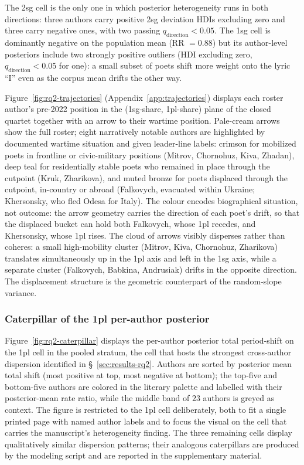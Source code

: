 \documentclass[12pt]{interact}
\theoremstyle{plain}%
\theoremstyle{definition}
\theoremstyle{remark}
\begin{document}
The 2sg cell is the only one in which posterior heterogeneity runs in both directions: three authors carry positive 2sg deviation HDIs excluding zero and three carry negative ones, with two passing $q_{\text{direction}} < 0.05$. The 1sg cell is dominantly negative on the population mean (RR $= 0.88$) but its author-level posteriors include two strongly positive outliers (HDI excluding zero, $q_{\text{direction}} < 0.05$ for one): a small subset of poets shift more weight onto the lyric ``I'' even as the corpus mean drifts the other way.

Figure~\ref{fig:rq2-trajectories} (Appendix~\ref{app:trajectories}) displays each roster author's pre-2022 position in the (1sg-share, 1pl-share) plane of the closed quartet together with an arrow to their wartime position. Pale-cream arrows show the full roster; eight narratively notable authors are highlighted by documented wartime situation and given leader-line labels: crimson for mobilized poets in frontline or civic-military positions (Mitrov, Chornohuz, Kiva, Zhadan), deep teal for residentially stable poets who remained in place through the cutpoint (Kruk, Zharikova), and muted bronze for poets displaced through the cutpoint, in-country or abroad (Falkovych, evacuated within Ukraine; Khersonsky, who fled Odesa for Italy). The colour encodes biographical situation, not outcome: the arrow geometry carries the direction of each poet's drift, so that the displaced bucket can hold both Falkovych, whose 1pl recedes, and Khersonsky, whose 1pl rises. The cloud of arrows visibly disperses rather than coheres: a small high-mobility cluster (Mitrov, Kiva, Chornohuz, Zharikova) translates simultaneously up in the 1pl axis and left in the 1sg axis, while a separate cluster (Falkovych, Babkina, Andrusiak) drifts in the opposite direction. The displacement structure is the geometric counterpart of the random-slope variance.

\subsubsection{Caterpillar of the 1pl per-author posterior}

Figure~\ref{fig:rq2-caterpillar} displays the per-author posterior total period-shift on the 1pl cell in the pooled stratum, the cell that hosts the strongest cross-author dispersion identified in \S~\ref{sec:results-rq2}. Authors are sorted by posterior mean total shift (most positive at top, most negative at bottom); the top-five and bottom-five authors are colored in the literary palette and labelled with their posterior-mean rate ratio, while the middle band of $23$ authors is greyed as context. The figure is restricted to the 1pl cell deliberately, both to fit a single printed page with named author labels and to focus the visual on the cell that carries the manuscript's heterogeneity finding. The three remaining cells display qualitatively similar dispersion patterns; their analogous caterpillars are produced by the modeling script and are reported in the supplementary material.
\end{document}
